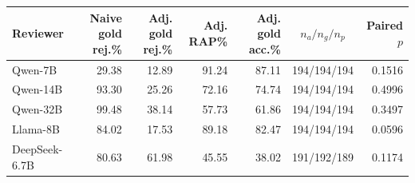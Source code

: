 \begin{tabular}{lrrrrcr}
\toprule
Reviewer & Naive gold rej.\% & Adj. gold rej.\% & Adj. RAP\% & Adj. gold acc.\% & $n_a/n_g/n_p$ & Paired $p$ \\
\midrule
Qwen-7B & 29.38 & 12.89 & 91.24 & 87.11 & 194/194/194 & 0.1516 \\
Qwen-14B & 93.30 & 25.26 & 72.16 & 74.74 & 194/194/194 & 0.4996 \\
Qwen-32B & 99.48 & 38.14 & 57.73 & 61.86 & 194/194/194 & 0.3497 \\
Llama-8B & 84.02 & 17.53 & 89.18 & 82.47 & 194/194/194 & 0.0596 \\
DeepSeek-6.7B & 80.63 & 61.98 & 45.55 & 38.02 & 191/192/189 & 0.1174 \\
\bottomrule
\end{tabular}
